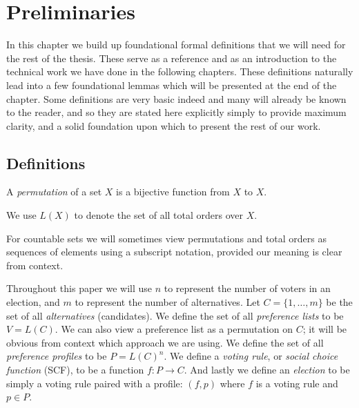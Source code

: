 
\chapter{Preliminaries}

	In this chapter we build up foundational formal definitions that we will need for the rest of the thesis. These serve as a reference and as an introduction to the technical work we have done in the following chapters. These definitions naturally lead into a few foundational lemmas which will be presented at the end of the chapter. Some definitions are very basic indeed and many will already be known to the reader, and so they are stated here explicitly simply to provide maximum clarity, and a solid foundation upon which to present the rest of our work.

\section{Definitions}

	\begin{definition}
		A \emph{permutation} of a set $X$ is a bijective function from $X$ to $X$.
	\end{definition}

	\begin{definition}
		We use $L(X)$ to denote the set of all total orders over $X$.
	\end{definition}

	For countable sets we will sometimes view permutations and total orders as sequences of elements using a subscript notation, provided our meaning is clear from context.

	\begin{definition}
		Throughout this paper we will use $n$ to represent the number of voters in an election, and $m$ to represent the number of alternatives. Let $C = \{1, \ldots, m\}$ be the set of all \emph{alternatives} (candidates). We define the set of all \emph{preference lists} to be $V = L(C)$. We can also view a preference list as a permutation on $C$; it will be obvious from context which approach we are using. We define the set of all \emph{preference profiles} to be $P = L(C)^n$. We define a \emph{voting rule}, or \emph{social choice function} (SCF), to be a function $f : P \to C$. And lastly we define an \emph{election} to be simply a voting rule paired with a profile: $(f, p)$ where $f$ is a voting rule and $p \in P$.
	\end{definition}

